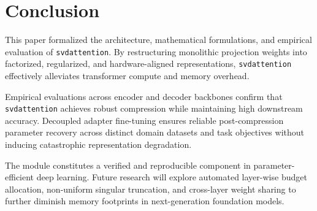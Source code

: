 \section{Conclusion}
This paper formalized the architecture, mathematical formulations, and empirical evaluation of \texttt{svdattention}. By restructuring monolithic projection weights into factorized, regularized, and hardware-aligned representations, \texttt{svdattention} effectively alleviates transformer compute and memory overhead.

Empirical evaluations across encoder and decoder backbones confirm that \texttt{svdattention} achieves robust compression while maintaining high downstream accuracy. Decoupled adapter fine-tuning ensures reliable post-compression parameter recovery across distinct domain datasets and task objectives without inducing catastrophic representation degradation.

The module constitutes a verified and reproducible component in parameter-efficient deep learning. Future research will explore automated layer-wise budget allocation, non-uniform singular truncation, and cross-layer weight sharing to further diminish memory footprints in next-generation foundation models.
